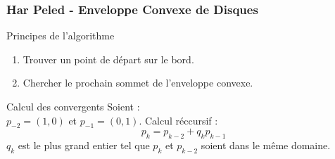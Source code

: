\begin{frame}
\frametitle{Har Peled - Enveloppe Convexe de Disques}

\begin{block}{Principes de l'algorithme}
  \begin{enumerate}
    \item Trouver un point de départ sur le bord.\\
    \item Chercher le prochain sommet de l'enveloppe convexe.\\
  \end{enumerate}
\end{block}

\begin{block}{Calcul des convergents}
  Soient :\\
  $p_{-2} = (1,0)$ et $p_{-1} = (0,1)$.
  Calcul réccursif : \\
  \alert{$$p_{k} = p_{k-2} + q_k p_{k-1}$$}
  $q_k$ est le plus grand entier tel que $p_{k}$ et $p_{k-2}$ soient dans le même domaine.
\end{block}
\end{frame}

